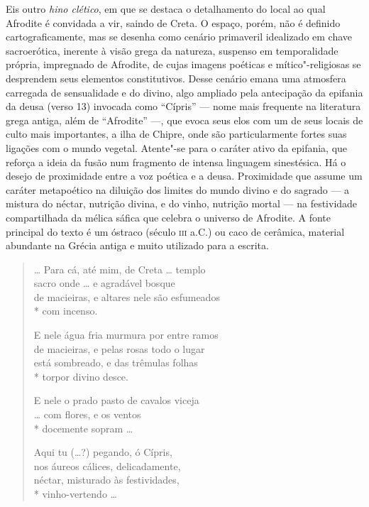 {\small Eis outro \textit{hino clético}, em que se destaca o detalhamento do local ao
qual Afrodite é convidada a vir, saindo de Creta. O espaço, porém, não é
definido cartograficamente, mas se desenha como cenário primaveril idealizado
em chave sacroerótica, inerente à visão grega da natureza, suspenso em
temporalidade própria, impregnado de Afrodite, de cujas imagens poéticas e
mítico"-religiosas se desprendem seus elementos constitutivos. Desse cenário
emana uma atmosfera carregada de sensualidade e do divino, algo ampliado pela
antecipação da epifania da deusa (verso 13) invocada como ``Cípris'' ---
nome mais frequente na literatura grega antiga, além de “Afrodite” ---, que evoca
seus elos com um de seus locais de culto mais importantes, a ilha de Chipre,
onde são particularmente fortes suas ligações com o mundo vegetal. Atente"-se
para o caráter ativo da epifania, que reforça a ideia da fusão num fragmento de intensa linguagem sinestésica. Há o desejo de proximidade
entre a voz poética e a deusa. Proximidade que assume um caráter metapoético na diluição dos limites do mundo divino e do sagrado --- a mistura do néctar, nutrição divina, e do vinho, nutrição mortal --- na festividade compartilhada da mélica sáfica que celebra o universo de Afrodite. A fonte principal do texto é um óstraco (século \textsc{iii} a.C.) ou caco de cerâmica, material abundante na Grécia antiga e muito utilizado para a
escrita.}

\begin{verse}
\ldots{} Para cá, até mim, de Creta \ldots{} templo\\
sacro onde \ldots{} e agradável bosque\\
de macieiras, e altares nele são esfumeados\\*
com incenso.

E nele água fria murmura por entre ramos\\
de macieiras, e pelas rosas todo o lugar\\
está sombreado, e das trêmulas folhas\\*
torpor divino desce.

E nele o prado pasto de cavalos viceja\\
\ldots{} com flores, e os ventos\\*
docemente sopram \ldots{}

Aqui tu (\ldots{}?) pegando, ó Cípris,\\
nos áureos cálices, delicadamente,\\
néctar, misturado às festividades,\\*
vinho-vertendo \ldots{}
\end{verse}


